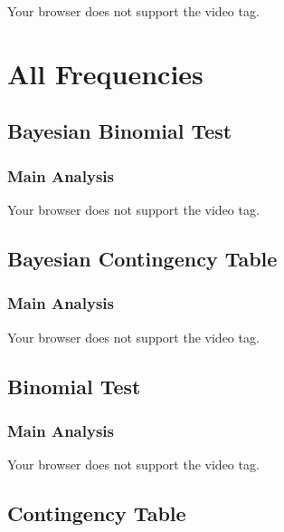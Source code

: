 \documentclass[
  letterpaper,
  DIV=11,
  numbers=noendperiod]{scrreprt}
\begin{document}
Your browser does not support the video tag.


\hypertarget{all-frequencies}{%
\chapter{All Frequencies}\label{all-frequencies}}

\hypertarget{bayesian-binomial-test}{%
\section{Bayesian Binomial Test}\label{bayesian-binomial-test}}

\hypertarget{main-analysis-12}{%
\subsection{Main Analysis}\label{main-analysis-12}}

Your browser does not support the video tag.

\hypertarget{bayesian-contingency-table}{%
\section{Bayesian Contingency Table}\label{bayesian-contingency-table}}

\hypertarget{main-analysis-13}{%
\subsection{Main Analysis}\label{main-analysis-13}}

Your browser does not support the video tag.

\hypertarget{binomial-test}{%
\section{Binomial Test}\label{binomial-test}}

\hypertarget{main-analysis-14}{%
\subsection{Main Analysis}\label{main-analysis-14}}

Your browser does not support the video tag.

\hypertarget{contingency-table}{%
\section{Contingency Table}\label{contingency-table}}
\end{document}

